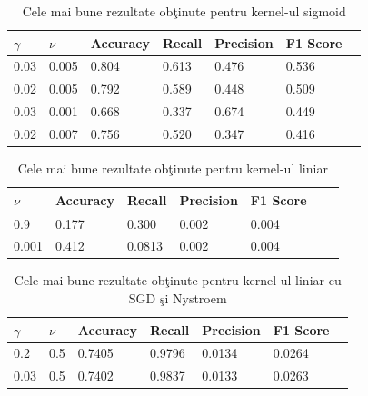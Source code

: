 \begin{table}[H]
    \centering
    \begin{tabularx}{\textwidth}{
        |X
        |X
        |X
        |X
        |X
        |X
        |X|
    }
    \hline
    $\gamma$ & $\nu$ & {Accuracy} & {Recall} & {Precision} & {F1 Score} \\
    \hline
    \rowcolor{gray!20} 0.03	& 0.005	& 0.804 & 0.613	& 0.476 & 0.536\\
    0.02 & 0.005 & 0.792 & 0.589 & 0.448 & 0.509 \\
    \rowcolor{gray!20} 0.03	& 0.001	& 0.668 & 0.337	& 0.674 & 0.449    \\
    0.02 & 0.007 & 0.756 & 0.520 & 0.347 & 0.416 \\
    \hline
  \end{tabularx}
  \caption{Cele mai bune rezultate obţinute pentru kernel-ul sigmoid}
\end{table}

\begin{table}[H]
    \centering
    \begin{tabularx}{\textwidth}{
        |X
        |X
        |X
        |X
        |X
        |X
        |X|
    }
    \hline
    $\nu$ & {Accuracy} & {Recall} & {Precision} & {F1 Score} \\
    \hline
    \rowcolor{gray!20} 0.9 & 0.177 & 0.300 & 0.002 & 0.004    \\
    0.001 & 0.412	& 0.0813	& 0.002	& 0.004 \\
    \hline
  \end{tabularx}
  \caption{Cele mai bune rezultate obţinute pentru kernel-ul liniar}
\end{table}

\begin{table}[H]
    \centering
    \begin{tabularx}{\textwidth}{
        |X
        |X
        |X
        |X
        |X
        |X
        |X|
    }
    \hline
    $\gamma$ & $\nu$ & {Accuracy} & {Recall} & {Precision} & {F1 Score} \\
    \hline
    \rowcolor{gray!20} 0.2 & 0.5 & 0.7405 & 0.9796 & 0.0134 & 0.0264 \\
    0.03 & 0.5 & 0.7402 & 0.9837 &  0.0133 &   0.0263 \\
    \hline
  \end{tabularx}
  \caption{Cele mai bune rezultate obţinute pentru kernel-ul liniar cu SGD şi Nystroem}
\end{table}

